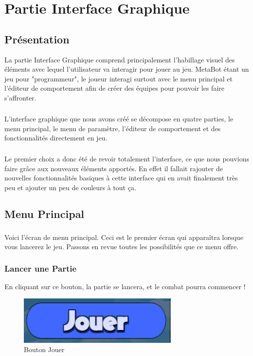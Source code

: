 \documentclass{report}
\begin{document}
\newpage

\chapter{Partie Interface Graphique}
\section{Présentation}
La partie Interface Graphique comprend principalement l'habillage visuel des éléments avec lequel l'utilisateur va interagir pour jouer au jeu. MetaBot étant un jeu pour "programmeur", le joueur interagi surtout avec le menu principal et l'éditeur de comportement afin de créer des équipes pour pouvoir les faire s'affronter.
\paragraph{}
L'interface graphique que nous avons créé se décompose en quatre parties, le menu principal, le menu de paramètre, l'éditeur de comportement et des fonctionnalités directement en jeu.
\paragraph{}
Le premier choix a donc été de revoir totalement l'interface, ce que nous pouvions faire grâce aux nouveaux éléments apportés. En effet il fallait rajouter de nouvelles fonctionnalités basiques à cette interface qui en avait finalement très peu et ajouter un peu de couleurs à tout ça.


\section{Menu Principal}
\paragraph{}
Voici l’écran de menu principal. Ceci est le premier écran qui apparaîtra lorsque vous lancerez le jeu.
Passons en revue toutes les possibilités que ce menu offre.
\subsection{Lancer une Partie}
En cliquant sur ce bouton, la partie se lancera, et le combat pourra commencer !

\begin{figure}[!h]
	\centering
		\includegraphics[scale=0.65]{BoutonJouer}
	\caption{Bouton Jouer}
\end{figure}
\end{document}

